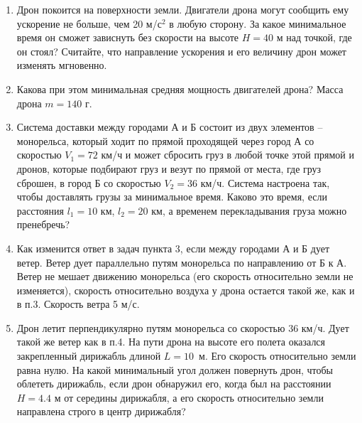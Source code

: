 
\begin{enumerate}
    \item Дрон покоится на поверхности земли. Двигатели дрона могут сообщить ему ускорение не больше, чем 20 м/с$^2$ в любую сторону. За какое минимальное время он сможет зависнуть без скорости на высоте $H = 40$ м над точкой, где он стоял? Считайте, что направление ускорения и его величину дрон может изменять мгновенно.
    \item Какова при этом минимальная средняя мощность двигателей дрона? Масса дрона $m = 140$ г.
    \item Система доставки между городами А и Б состоит из двух элементов – монорельса, который ходит по прямой проходящей через город А со скоростью $V_1 = 72$ км/ч и может сбросить груз в любой точке этой прямой и дронов, которые подбирают груз и везут по прямой от места, где груз сброшен, в город Б со скоростью $V_2 = 36$ км/ч. Система настроена так, чтобы доставлять грузы за минимальное время. Каково это время, если расстояния $l_1 = 10$ км, $l_2 = 20$ км, а временем перекладывания груза можно пренебречь?
    

    \item Как изменится ответ в задач пункта 3, если между городами А и Б дует ветер. Ветер дует параллельно путям монорельса по направлению от Б к А. Ветер не мешает движению монорельса (его скорость относительно земли не изменяется), скорость относительно воздуха у дрона остается такой же, как и в п.3.  Скорость ветра 5 м/с.
    \item Дрон летит перпендикулярно путям монорельса со скоростью 36 км/ч. Дует такой же ветер как в п.4.  На пути дрона на высоте его полета оказался закрепленный дирижабль длиной \linebreak $L = 10$~м. Его скорость относительно земли равна нулю. На какой минимальный угол должен повернуть дрон, чтобы облететь дирижабль, если дрон обнаружил его, когда был на расстоянии \linebreak $H = 4.4$ м от середины дирижабля, а его скорость относительно земли направлена строго в центр дирижабля?
\end{enumerate}